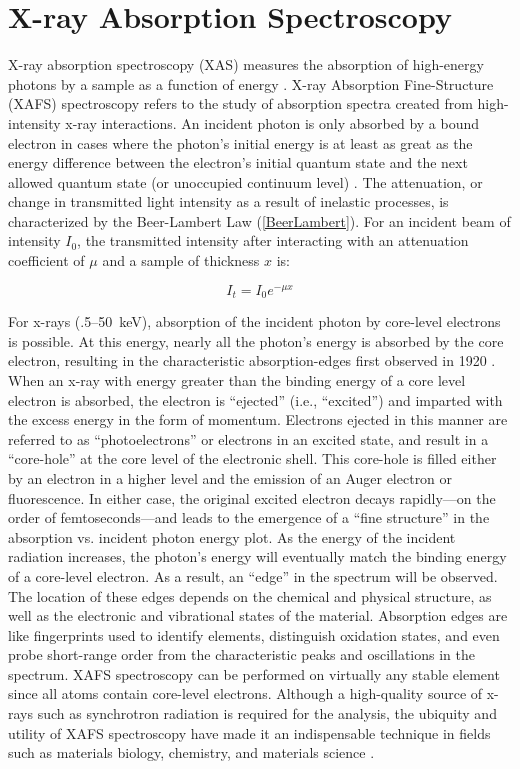 \section{X-ray Absorption Spectroscopy}
X-ray absorption spectroscopy (XAS) measures the absorption of high-energy photons by a sample as a function of energy \cite{gardenghi2012synchrotron}. X-ray Absorption Fine-Structure (XAFS) spectroscopy refers to the study of absorption spectra created from high-intensity x-ray interactions. An incident photon is only absorbed by a bound electron in cases where the photon's initial energy is at least as great as the energy difference between the electron’s initial quantum state and the next allowed quantum state (or unoccupied continuum level) \cite{einstein1905photoelectriceffect}. The attenuation, or change in transmitted light intensity as a result of inelastic processes, is characterized by the Beer-Lambert Law (\ref{BeerLambert}). For an incident beam of intensity $I_0$, the transmitted intensity after interacting with an attenuation
coefficient of $ \mu $ and a sample of thickness $ x $ is: 

\begin{equation}
    \label{BeerLambert}
    I_t = I_0 e^{-\mu x}
\end{equation}

For x-rays (.5--50~keV), absorption of the incident photon by core-level electrons is possible. At this energy, nearly all the photon's energy is absorbed by the core electron, resulting in the characteristic absorption-edges first observed in 1920 \cite{fricke1920, hertz1920ueber}. When an x-ray with energy greater than the binding energy of a core level electron is absorbed, the electron is “ejected” (i.e., “excited”) and imparted with the excess energy in the form of momentum. Electrons ejected in this manner are referred to as ``photoelectrons'' or electrons in an excited state, and result in a ``core-hole'' at the core level of the electronic shell. This core-hole is filled either by an electron in a higher level and the emission of an Auger electron or fluorescence. In either case, the original excited electron decays rapidly---on the order of femtoseconds---and leads to the emergence of a ``fine structure'' in the absorption vs. incident photon energy plot. As the energy of the incident radiation increases, the photon's energy will eventually match the binding energy of a core-level electron. As a result, an ``edge'' in the spectrum will be observed. The location of these edges depends on the chemical and physical structure, as well as the electronic and vibrational states of the material. Absorption edges are like fingerprints used to identify elements, distinguish oxidation states, and even probe short-range order from the characteristic peaks and oscillations in the spectrum. XAFS spectroscopy can be performed on virtually any stable element since all atoms contain core-level electrons. Although a high-quality source of x-rays such as synchrotron radiation is required for the analysis, the ubiquity and utility of XAFS spectroscopy have made it an indispensable technique in fields such as materials biology, chemistry, and materials science \cite{rehrXAFS2000review} \cite{newville2014fundamentals}.

